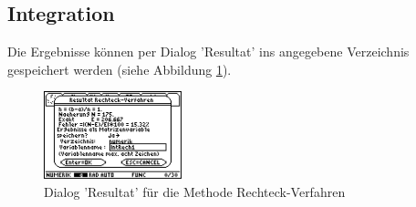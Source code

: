 \documentclass[a5paper,9pt]{scrreprt}
\begin{document}
\subsection{Integration}
Die Ergebnisse k\"onnen per Dialog 'Resultat’ ins angegebene Verzeichnis gespeichert werden (siehe Abbildung \ref{fig:ResultatIntegrationRechteck}).
\begin{figure}[h]
  \centering
  \includegraphics[width=4cm]{img/nummeth_image040.png}
  \caption{Dialog 'Resultat' f\"ur die Methode Rechteck-Verfahren}
  \label{fig:ResultatIntegrationRechteck}
\end{figure}

\newpage
\end{document}
